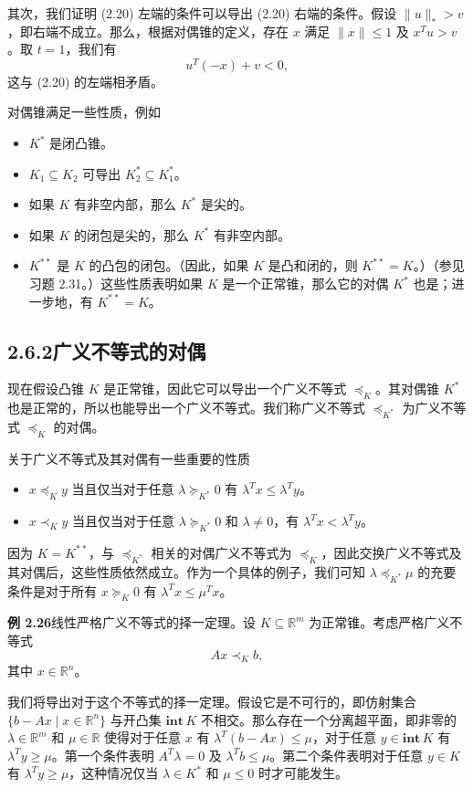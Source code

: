 \documentclass[UTF8, 12pt, fontset=fandol, oneside]{ctexart}
\begin{document}
其次，我们证明 (2.20) 左端的条件可以导出 (2.20) 右端的条件。假设 $\|u\|_*>v$，即右端不成立。那么，根据对偶锥的定义，存在 $x$ 满足 $\|x\|\le1$ 及 $x^Tu>v$。取 $t=1$，我们有
\[
  u^T(-x)+v<0,
\]
这与 (2.20) 的左端相矛盾。

对偶锥满足一些性质，例如
\begin{itemize}
  \item $K^*$ 是闭凸锥。
  \item $K_1\subseteq K_2$ 可导出 $K_2^*\subseteq K_1^*$。
  \item 如果 $K$ 有非空内部，那么 $K^*$ 是尖的。
  \item 如果 $K$ 的闭包是尖的，那么 $K^*$ 有非空内部。
  \item $K^{**}$ 是 $K$ 的凸包的闭包。（因此，如果 $K$ 是凸和闭的，则 $K^{**}=K$。）（参见习题 2.31。）这些性质表明如果 $K$ 是一个正常锥，那么它的对偶 $K^*$ 也是；进一步地，有 $K^{**}=K$。
\end{itemize}

\subsection*{2.6.2\quad 广义不等式的对偶}

现在假设凸锥 $K$ 是正常锥，因此它可以导出一个广义不等式 $\preceq_K$。其对偶锥 $K^*$ 也是正常的，所以也能导出一个广义不等式。我们称广义不等式 $\preceq_{K^*}$ 为广义不等式 $\preceq_K$ 的对偶。

关于广义不等式及其对偶有一些重要的性质
\begin{itemize}
  \item $x\preceq_K y$ 当且仅当对于任意 $\lambda\succeq_{K^*}0$ 有 $\lambda^Tx\le\lambda^Ty$。
  \item $x\prec_K y$ 当且仅当对于任意 $\lambda\succeq_{K^*}0$ 和 $\lambda\ne0$，有 $\lambda^Tx<\lambda^Ty$。
\end{itemize}
因为 $K=K^{**}$，与 $\preceq_{K^*}$ 相关的对偶广义不等式为 $\preceq_K$，因此交换广义不等式及其对偶后，这些性质依然成立。作为一个具体的例子，我们可知 $\lambda\preceq_{K^*}\mu$ 的充要条件是对于所有 $x\succeq_K0$ 有 $\lambda^Tx\le\mu^Tx$。

\noindent\textbf{例 2.26}\quad 线性严格广义不等式的择一定理。设 $K\subseteq\mathbb{R}^m$ 为正常锥。考虑严格广义不等式
\begin{equation}
  Ax\prec_K b,
  \tag{2.21}
\end{equation}
其中 $x\in\mathbb{R}^n$。

我们将导出对于这个不等式的择一定理。假设它是不可行的，即仿射集合 $\{b-Ax\mid x\in\mathbb{R}^n\}$ 与开凸集 $\mathbf{int}\,K$ 不相交。那么存在一个分离超平面，即非零的 $\lambda\in\mathbb{R}^m$ 和 $\mu\in\mathbb{R}$ 使得对于任意 $x$ 有 $\lambda^T(b-Ax)\le\mu$，对于任意 $y\in\mathbf{int}\,K$ 有 $\lambda^Ty\ge\mu$。第一个条件表明 $A^T\lambda=0$ 及 $\lambda^Tb\le\mu$。第二个条件表明对于任意 $y\in K$ 有 $\lambda^Ty\ge\mu$，这种情况仅当 $\lambda\in K^*$ 和 $\mu\le0$ 时才可能发生。
\end{document}
